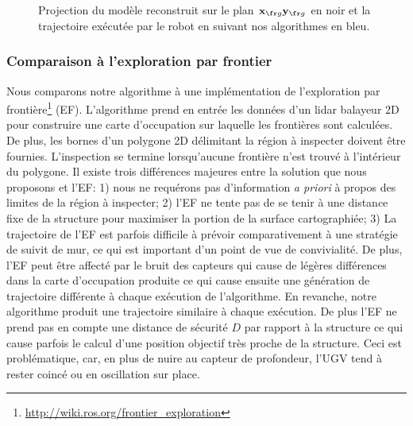 \begin{figure}[p]
{  	\label{subfig:large gamma husky 4.5}
  }
  \hfil
  \caption[Résultats de reconstruction en simulation.]{
  Projection du modèle reconstruit sur le plan $\vect{x}_{\fr g}\vect{y}_{\fr g}$ en noir et la trajectoire exécutée par le robot en suivant nos algorithmes en bleu.
  }
  \label{fig:relative size}
\end{figure}

\subsubsection{Comparaison à l'exploration par frontier}

Nous comparons notre algorithme à une implémentation de l'exploration par frontière\footnote{\url{http://wiki.ros.org/frontier_exploration}} (EF). L'algorithme prend en entrée les données d'un lidar balayeur 2D pour construire une carte d'occupation sur laquelle les frontières sont calculées. De plus, les bornes d'un polygone 2D délimitant la région à inspecter doivent être fournies. L'inspection se termine lorsqu’aucune frontière n'est trouvé à l'intérieur du polygone. Il existe trois différences majeures entre la solution que nous proposons et l'EF: 1) nous ne requérons pas d'information \textit{a priori} à propos des limites de la région à inspecter; 2) l'EF ne tente pas de se tenir à une distance fixe de la structure pour maximiser la portion de la surface cartographiée; 3) La trajectoire de l'EF est parfois difficile à prévoir comparativement à une stratégie de suivit de mur, ce qui est important d'un point de vue de convivialité. De plus, l'EF peut être affecté par le bruit des capteurs qui cause de légères différences dans la carte d'occupation produite ce qui cause ensuite une génération de trajectoire différente à chaque exécution de l'algorithme. En revanche, notre algorithme produit une trajectoire similaire à chaque exécution. De plus l'EF ne prend pas en compte une distance de sécurité $D$ par rapport à la structure ce qui cause parfois le calcul d'une position objectif très proche de la structure. Ceci est problématique, car, en plus de nuire au capteur de profondeur, l'UGV tend à rester coincé ou en oscillation sur place.

